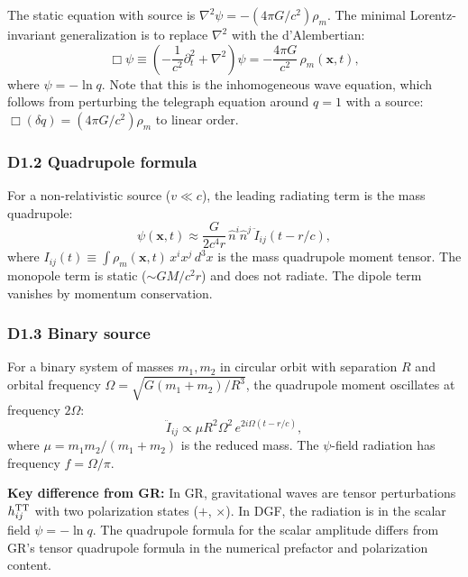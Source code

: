 \documentclass[reprint]{revtex4-2}
\begin{document}
The static equation with source is $\nabla^2\psi = -(4\pi G/c^2)\rho_m$. The minimal Lorentz-invariant generalization is to replace $\nabla^2$ with the d'Alembertian:
\begin{equation}
\Box\psi \equiv \left(-\frac{1}{c^2}\partial_t^2 + \nabla^2\right)\psi = -\frac{4\pi G}{c^2}\,\rho_m(\mathbf{x},t),
\label{eq:scalar_wave}
\end{equation}
where $\psi = -\ln q$. Note that this is the inhomogeneous wave equation, which follows from perturbing the telegraph equation around $q=1$ with a source: $\Box(\delta q) = (4\pi G/c^2)\rho_m$ to linear order.

\subsubsection{D1.2 Quadrupole formula}

For a non-relativistic source ($v \ll c$), the leading radiating term is the mass quadrupole:
\begin{equation}
\boxed{\psi(\mathbf{x},t) \approx \frac{G}{2c^4 r}\,\hat{n}^i\hat{n}^j\,\ddot{I}_{ij}(t - r/c)},
\label{eq:quadrupole}
\end{equation}
where $I_{ij}(t) \equiv \int \rho_m(\mathbf{x},t)\,x^i x^j\,d^3x$ is the mass quadrupole moment tensor. The monopole term is static ($\sim GM/c^2 r$) and does not radiate. The dipole term vanishes by momentum conservation.

\subsubsection{D1.3 Binary source}

For a binary system of masses $m_1, m_2$ in circular orbit with separation $R$ and orbital frequency $\Omega = \sqrt{G(m_1+m_2)/R^3}$, the quadrupole moment oscillates at frequency $2\Omega$:
\begin{equation}
\ddot{I}_{ij} \propto \mu R^2\Omega^2\,e^{2i\Omega(t - r/c)},
\end{equation}
where $\mu = m_1 m_2/(m_1+m_2)$ is the reduced mass. The $\psi$-field radiation has frequency $f = \Omega/\pi$.

\textbf{Key difference from GR:} In GR, gravitational waves are tensor perturbations $h_{ij}^{\rm TT}$ with two polarization states ($+$, $\times$). In DGF, the radiation is in the scalar field $\psi = -\ln q$. The quadrupole formula for the scalar amplitude differs from GR's tensor quadrupole formula in the numerical prefactor and polarization content.
\end{document}

